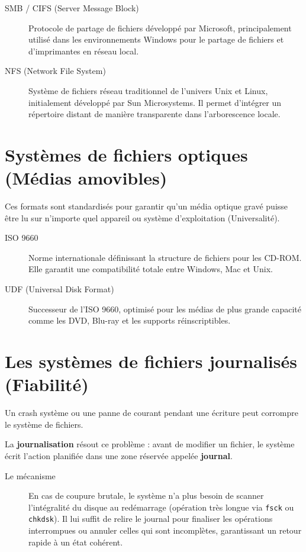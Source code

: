 \begin{description}
    \item[SMB / CIFS (Server Message Block)] Protocole de partage de fichiers développé par Microsoft, principalement utilisé dans les environnements Windows pour le partage de fichiers et d'imprimantes en réseau local.
    \item[NFS (Network File System)] Système de fichiers réseau traditionnel de l'univers Unix et Linux, initialement développé par Sun Microsystems. Il permet d'intégrer un répertoire distant de manière transparente dans l'arborescence locale.
\end{description}


\section{Systèmes de fichiers optiques (Médias amovibles)}
Ces formats sont standardisés pour garantir qu'un média optique gravé puisse être lu sur n'importe quel appareil ou système d'exploitation (Universalité).

\begin{description}
    \item[ISO 9660] Norme internationale définissant la structure de fichiers pour les CD-ROM. Elle garantit une compatibilité totale entre Windows, Mac et Unix.
    \item[UDF (Universal Disk Format)] Successeur de l'ISO 9660, optimisé pour les médias de plus grande capacité comme les DVD, Blu-ray et les supports réinscriptibles.
\end{description}


\section{Les systèmes de fichiers journalisés (Fiabilité)}
Un crash système ou une panne de courant pendant une écriture peut corrompre le système de fichiers.

La \textbf{journalisation} résout ce problème : avant de modifier un fichier, le système écrit l'action planifiée dans une zone réservée appelée \textbf{journal}.

\begin{description}
    \item[Le mécanisme] En cas de coupure brutale, le système n'a plus besoin de scanner l'intégralité du disque au redémarrage (opération très longue via \texttt{fsck} ou \texttt{chkdsk}). Il lui suffit de relire le journal pour finaliser les opérations interrompues ou annuler celles qui sont incomplètes, garantissant un retour rapide à un état cohérent.
\end{description}

